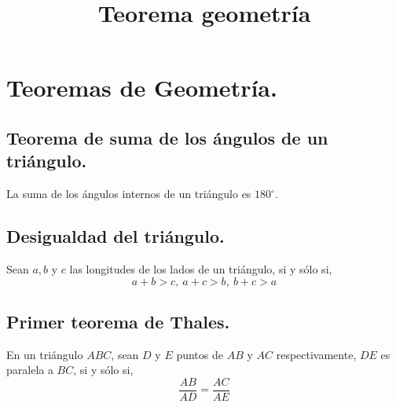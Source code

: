 \documentclass[12pt,a4paper]{book}
\title{Teorema geometría}
\begin{document}
\begin{figure}
\end{figure}
\tableofcontents
\let\cleardoublepage\clearpage
\chapter{Teoremas de Geometría.}
\section{Teorema de suma de los ángulos de un triángulo.} 
La suma de los ángulos internos de un triángulo es $180^\circ$.
\section{Desigualdad del triángulo.}
Sean $a, b$ y $c$ las longitudes de los lados de un triángulo, si y sólo si, 
$$a+b>c,\> a+c>b, \> b+c>a$$
\section{Primer teorema de Thales.}
En un triángulo $ABC$, sean $D$ y $E$ puntos de $AB$
y $AC$ respectivamente, $DE$ es paralela a $BC$, si y sólo si, $$\dfrac{AB}{AD}=\dfrac{AC}{AE}$$
\end{document}
